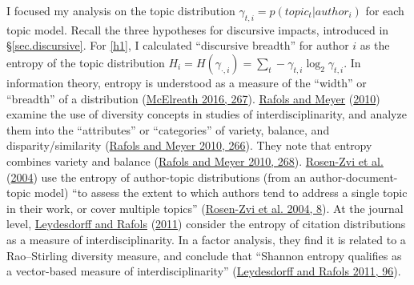 \documentclass[
  11pt,
]{article}
\begin{document}
I focused my analysis on the topic distribution \(\gamma_{t,i} = p(topic_t | author_i)\) for each topic model. Recall the three hypotheses for discursive impacts, introduced in §\ref{sec.discursive}. For \ref{h1}, I calculated ``discursive breadth'' for author \(i\) as the entropy of the topic distribution \(H_i = H(\gamma_{\cdot, i}) = \sum_t -\gamma_{t,i} \log_2 \gamma_{t,i}\). In information theory, entropy is understood as a measure of the ``width'' or ``breadth'' of a distribution (\protect\hyperlink{ref-McElreathStatisticalRethinkingBayesian2016}{McElreath 2016, 267}). \protect\hyperlink{ref-RafolsDiversityNetworkCoherence2010}{Rafols and Meyer} (\protect\hyperlink{ref-RafolsDiversityNetworkCoherence2010}{2010}) examine the use of diversity concepts in studies of interdisciplinarity, and analyze them into the ``attributes'' or ``categories'' of variety, balance, and disparity/similarity (\protect\hyperlink{ref-RafolsDiversityNetworkCoherence2010}{Rafols and Meyer 2010, 266}). They note that entropy combines variety and balance (\protect\hyperlink{ref-RafolsDiversityNetworkCoherence2010}{Rafols and Meyer 2010, 268}). \protect\hyperlink{ref-Rosen-ZviAuthortopicModelAuthors2004}{Rosen-Zvi et al.} (\protect\hyperlink{ref-Rosen-ZviAuthortopicModelAuthors2004}{2004}) use the entropy of author-topic distributions (from an author-document-topic model) ``to assess the extent to which authors tend to address a single topic in their work, or cover multiple topics'' (\protect\hyperlink{ref-Rosen-ZviAuthortopicModelAuthors2004}{Rosen-Zvi et al. 2004, 8}). At the journal level, \protect\hyperlink{ref-LeydesdorffIndicatorsInterdisciplinarityJournals2011}{Leydesdorff and Rafols} (\protect\hyperlink{ref-LeydesdorffIndicatorsInterdisciplinarityJournals2011}{2011}) consider the entropy of citation distributions as a measure of interdisciplinarity. In a factor analysis, they find it is related to a Rao--Stirling diversity measure, and conclude that ``Shannon entropy qualifies as a vector-based measure of interdisciplinarity'' (\protect\hyperlink{ref-LeydesdorffIndicatorsInterdisciplinarityJournals2011}{Leydesdorff and Rafols 2011, 96}).
\end{document}
